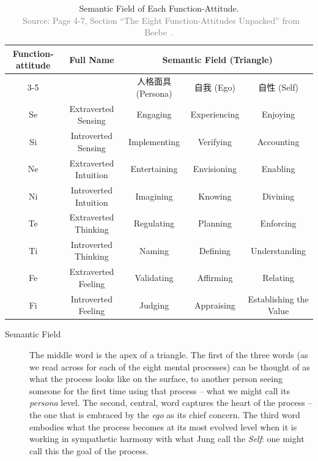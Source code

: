 \begin{table}[h!]
    \caption[Semantic Field of Each Function-Attitude. \verified]{Semantic Field of Each Function-Attitude.\\
    \verified~\textcolor{gray}{\small Source: Page 4-7, Section ``The Eight Function-Attitudes Unpacked'' from Beebe~\cite{beebe}.}}
    \begin{center}

        \begin{tabular}{ccccc}
            \toprule
            \multirow{2}{*}{\textbf{Function-attitude}} & \multirow{2}{*}{\textbf{Full Name}} & \multicolumn{3}{c}{\textbf{Semantic Field (Triangle)}} \tabularnewline
            \cmidrule(lr){3-5}
            & & \small{人格面具 (Persona)} & \small{自我 (Ego)} & \small{自性 (Self)} \tabularnewline
            \midrule

            \rowcolor{black!10}Se & Extraverted Sensing & Engaging & Experiencing & Enjoying \tabularnewline
            Si & Introverted Sensing & Implementing & Verifying & Accounting \tabularnewline

            \rowcolor{black!10}Ne & Extraverted Intuition & Entertaining & Envisioning & Enabling \tabularnewline
            Ni & Introverted Intuition & Imagining & Knowing & Divining \tabularnewline

            \rowcolor{black!10}Te & Extraverted Thinking & Regulating & Planning & Enforcing \tabularnewline
            Ti & Introverted Thinking & Naming & Defining & Understanding \tabularnewline

            \rowcolor{black!10}Fe & Extraverted Feeling & Validating & Affirming & Relating \tabularnewline
            Fi & Introverted Feeling & Judging & Appraising & Establishing the Value \tabularnewline

            \bottomrule
        \end{tabular}
    \end{center}

    {%
    \begin{description}

        \item[Semantic Field]
            The middle word is the apex of a triangle.
        The first of the three words (as we read across for each of the eight mental processes)
        can be thought of as what the process looks like on the surface, to another person seeing someone for the first time using that process -- what we might call its \textit{persona} level.
        The second, central, word captures the heart of the process -- the one that is
        embraced by the \textit{ego} as its chief concern.
        The third word embodies what the process becomes at its most evolved level when it
        is working in sympathetic harmony with what Jung call the \textit{Self}:
        one might call this the goal of the process.


\end{description}}
\end{table}
